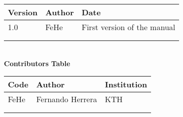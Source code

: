 
\begin{tabular}{|l|l|l|}
        \hline
        \textbf{Version} & \textbf{Author} & \textbf{Date}  \\
        \hline
        1.0     & FeHe & First version of the manual  \\
        \hline
        & & \\
        \hline 
        & &  \\
        \hline 
\end{tabular}\\[3cm]

\textbf{Contributors Table}\\[0.5cm]
\begin{tabular}{|l|l|l|}
        \hline
        \textbf{Code} & \textbf{Author} & \textbf{Institution} \\
        \hline
        FeHe    & Fernando Herrera & KTH  \\
        \hline
        & & \\
        \hline 
        & &  \\
        \hline 
\end{tabular}
